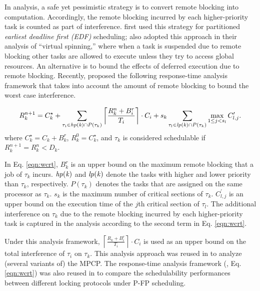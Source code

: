 In analysis, a safe yet pessimistic strategy is to convert remote blocking into computation. Accordingly, the remote blocking incurred by each higher-priority task is counted as part of interference. \citet{block-2007} first used this strategy for partitioned \emph{earliest deadline first (EDF)} scheduling;  \citet{lakshmanan-2009} also adopted this approach in their analysis of ``virtual spinning,'' where when a task is suspended due to remote blocking other tasks are allowed to execute unless they try to access global resources. An alternative is to bound the effects of deferred execution due to remote blocking. Recently, \citet{lakshmanan-2009} proposed the following response-time analysis framework that takes into account the amount of remote blocking to bound the worst case interference.

\begin{equation}
\label{eqn:wcrt}
R_k^{n+1} = C_k^{\star} + \sum_{\tau_i \in \mathit{hp(k)} \cap P(\tau_k)} \left \lceil \frac{R_k^n + B_i^r}{T_i} \right \rceil \cdot C_i + s_k \sum_{\tau_l \in \mathit{lp(k)} \cap P(\tau_k)} \max_{1 \leq j < s_l} C_{l,j}^{\prime}.  
\end{equation}
where $C_k^{\star} = C_k + B_k^r$, $R_k^0 = C_k^{\star}$, and $\tau_k$ is considered schedulable if $R_k^{n+1} = R_k^n < D_k$. 

In Eq. \ref{eqn:wcrt}, $B_k^r$ is an upper bound on the maximum remote blocking that a job of $\tau_k$ incurs. $\mathit{hp(k)}$ and $\mathit{lp(k)}$ denote the tasks with higher and lower priority than $\tau_k$, respectively. $P(\tau_k)$ denotes the tasks that are assigned on the same processor as $\tau_k$. $s_k$ is the maximum number of critical sections of $\tau_k$. $C_{l,j}^{\prime}$ is an upper bound on the execution time of the $j$th critical section of $\tau_l$. The additional interference on $\tau_k$ due to the remote blocking incurred by each higher-priority task is captured in the analysis according to the second term in Eq. \ref{eqn:wcrt}.

Under this analysis framework, $\left \lceil \frac{R_k + B_i^r}{T_i} \right \rceil \cdot C_i$ is used as an upper bound on the total interference of $\tau_i$ on $\tau_k$. This analysis approach was reused in \cite{yang-2013,kim-2014,carminati-2014,yang-2014} to analyze (several variants of) the MPCP. The response-time analysis framework (\ie, Eq. \ref{eqn:wcrt}) was also reused in \cite{zeng-2011,bbb-2013,han-2014} to compare the schedulability performances between different locking protocols under P-FP scheduling. 

